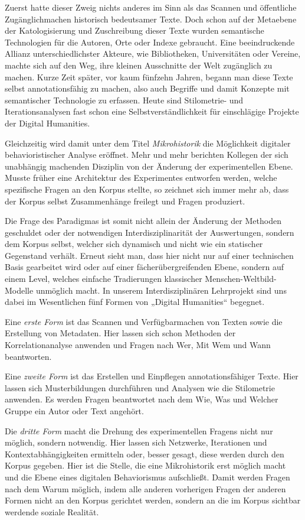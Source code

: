 \documentclass[12pt,a4paper]{article}
\begin{document}
Zuerst hatte dieser Zweig nichts anderes im Sinn als das Scannen und
öffentliche Zugänglichmachen historisch bedeutsamer Texte. Doch schon auf der
Metaebene der Katologisierung und Zuschreibung dieser Texte wurden semantische
Technologien für die Autoren, Orte oder Indexe gebraucht. Eine beeindruckende
Allianz unterschiedlichster Akteure, wie Bibliotheken, Universitäten oder
Vereine, machte sich auf den Weg, ihre kleinen Ausschnitte der Welt zugänglich
zu machen. Kurze Zeit später, vor kaum fünfzehn Jahren, begann man diese Texte
selbst annotationsfähig zu machen, also auch Begriffe und damit Konzepte mit
semantischer Technologie zu erfassen. Heute sind Stilometrie- und
Iterationsanalysen fast schon eine Selbstverständlichkeit für einschlägige
Projekte der Digital Humanities.

Gleichzeitig wird damit unter dem Titel \emph{Mikrohistorik} die Möglichkeit
digitaler behavioristischer Analyse eröffnet. Mehr und mehr berichten Kollegen
der sich unabhängig machenden Disziplin von der Änderung der experimentellen
Ebene. Musste früher eine Architektur des Experimentes entworfen werden,
welche spezifische Fragen an den Korpus stellte, so zeichnet sich immer mehr
ab, dass der Korpus selbst Zusammenhänge freilegt und Fragen produziert.

Die Frage des Paradigmas ist somit nicht allein der Änderung der Methoden
geschuldet oder der notwendigen Interdisziplinarität der Auswertungen, sondern
dem Korpus selbst, welcher sich dynamisch und nicht wie ein statischer
Gegenstand verhält. Erneut sieht man, dass hier nicht nur auf einer
technischen Basis gearbeitet wird oder auf einer fächerübergreifenden Ebene,
sondern auf einem Level, welches einfache Tradierungen klassischer
Menschen-Weltbild-Modelle unmöglich macht.  In unserem Interdisziplinären
Lehrprojekt sind uns dabei im Wesentlichen fünf Formen von „Digital
Humanities“ begegnet.

Eine \emph{erste Form} ist das Scannen und Verfügbarmachen von Texten sowie
die Erstellung von Metadaten. Hier lassen sich schon Methoden der
Korrelationanalyse anwenden und Fragen nach Wer, Mit Wem und Wann beantworten.

Eine \emph{zweite Form} ist das Erstellen und Einpflegen annotationsfähiger
Texte. Hier lassen sich Musterbildungen durchführen und Analysen wie die
Stilometrie anwenden. Es werden Fragen beantwortet nach dem Wie, Was und
Welcher Gruppe ein Autor oder Text angehört.

Die \emph{dritte Form} macht die Drehung des experimentellen Fragens nicht nur
möglich, sondern notwendig. Hier lassen sich Netzwerke, Iterationen und
Kontextabhängigkeiten ermitteln oder, besser gesagt, diese werden durch den
Korpus gegeben. Hier ist die Stelle, die eine Mikrohistorik erst möglich macht
und die Ebene eines digitalen Behaviorismus aufschließt. Damit werden Fragen
nach dem Warum möglich, indem alle anderen vorherigen Fragen der anderen Formen
nicht an den Korpus gerichtet werden, sondern an die im Korpus sichtbar
werdende soziale Realität.
\end{document}
